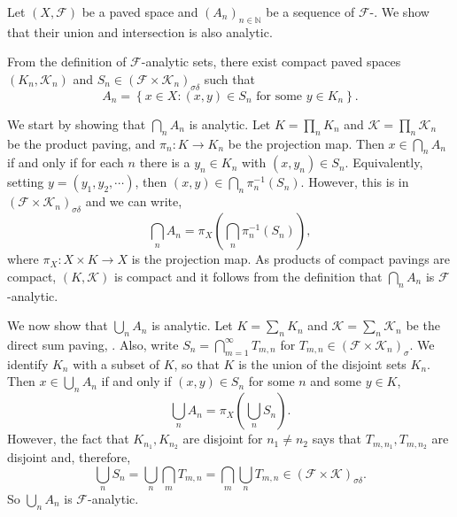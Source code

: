 \documentclass[12pt]{article}
\begin{document}

Let $(X,\mathcal{F})$ be a paved space and $(A_n)_{n\in\mathbb{N}}$ be a sequence of $\mathcal{F}$-. We show that their union and intersection is also analytic.

From the definition of $\mathcal{F}$-analytic sets, there exist compact paved spaces $(K_n,\mathcal{K}_n)$ and $S_n\in(\mathcal{F}\times\mathcal{K}_n)_{\sigma\delta}$ such that
\begin{equation*}
A_n=\left\{x\in X\colon (x,y)\in S_n\text{ for some }y\in K_n\right\}.
\end{equation*}

We start by showing that $\bigcap_nA_n$ is analytic. Let $K=\prod_nK_n$ and $\mathcal{K}=\prod_n\mathcal{K}_n$ be the product paving, and $\pi_n\colon K\rightarrow K_n$ be the projection map.
Then $x\in\bigcap_nA_n$ if and only if for each $n$ there is a $y_n\in K_n$ with $(x,y_n)\in S_n$. Equivalently, setting $y=(y_1,y_2,\cdots)$, then $(x,y)\in \bigcap_n\pi^{-1}_n(S_n)$. However, this is in $(\mathcal{F}\times\mathcal{K}_n)_{\sigma\delta}$ and we can write,
\begin{equation*}
\bigcap_nA_n = \pi_X\left(\bigcap_n\pi^{-1}_n(S_n)\right),
\end{equation*}
where $\pi_X\colon X\times K\rightarrow X$ is the projection map.
As products of compact pavings are compact, $(K,\mathcal{K})$ is compact and it follows from the definition that $\bigcap_nA_n$ is $\mathcal{F}$-analytic.


We now show that $\bigcup_n A_n$ is analytic. Let $K=\sum_nK_n$ and $\mathcal{K}=\sum_n\mathcal{K}_n$ be the direct sum paving, . Also, write $S_n=\bigcap_{m=1}^\infty T_{m,n}$ for $T_{m,n}\in(\mathcal{F}\times\mathcal{K}_n)_\sigma$.
We identify $K_n$ with a subset of $K$, so that $K$ is the union of the disjoint sets $K_n$.
Then $x\in\bigcup_nA_n$ if and only if $(x,y)\in S_n$ for some $n$ and some $y\in K$,
\begin{equation*}
\bigcup_nA_n=\pi_X\left(\bigcup_nS_n\right).
\end{equation*}
However, the fact that $K_{n_1},K_{n_2}$ are disjoint for $n_1\not= n_2$ says that $T_{m,n_1},T_{m,n_2}$ are disjoint and, therefore,
\begin{equation*}
\bigcup_nS_n=\bigcup_n\bigcap_mT_{m,n}=\bigcap_m\bigcup_nT_{m,n}\in\left(\mathcal{F}\times\mathcal{K}\right)_{\sigma\delta}.
\end{equation*}
So $\bigcup_nA_n$ is $\mathcal{F}$-analytic.

\end{document}

